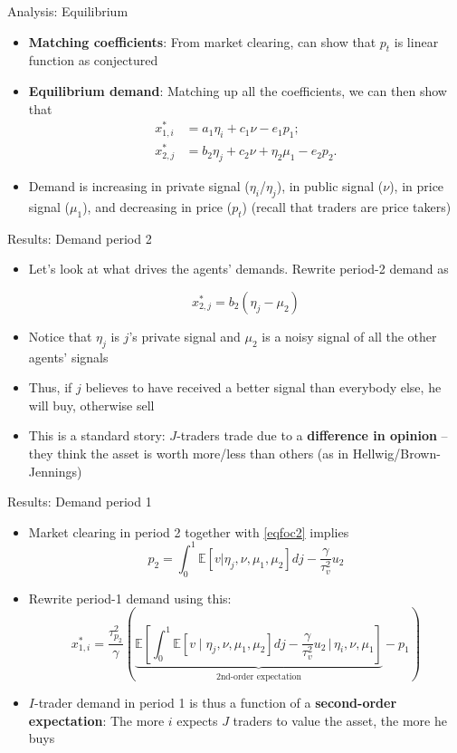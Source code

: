 \documentclass[english,10pt
,aspectratio=169
]{beamer}
\begin{document}
\begin{frame}{Analysis: Equilibrium}
	\begin{itemize}
		\item \textbf{Matching coefficients}: From market clearing, can show that $p_t$ is linear function as conjectured
		\item \textbf{Equilibrium demand}: Matching up all the coefficients, we can then show that
		\begin{align}
		x^*_{1,i} &=  a_1 \eta_i+c_1 \nu -e_1 p_1; \label{eqdem1} \\
		x^*_{2,j} &= b_2 \eta_j+c_2 \nu + \eta_2\mu_1-e_2 p_2. \label{eqdem2}
		\end{align} 
		\item Demand is increasing in private signal ($\eta_i$/$\eta_j$), in public signal ($\nu$), in price signal ($\mu_1$), and decreasing in price ($p_t$) 
		(recall that traders are price takers)
	\end{itemize}
\end{frame}


\begin{frame}{Results: Demand period 2}
	\begin{itemize}
		\item Let's look at what drives the agents' demands. Rewrite period-2 demand as 
		\begin{block}{}
			\begin{equation} \label{eqdem2z}
			x^*_{2,j} = b_2 (\eta_j - \mu_2) 
			\end{equation}
		\end{block}
		\item Notice that $\eta_j$ is $j$'s private signal and  $\mu_2$ is a noisy signal of all the other agents' signals
		\item Thus, if $j$ believes to have received a better signal than everybody else, he will buy, otherwise sell
		\item This is a standard story: $J$-traders trade due to a \textbf{difference in opinion} -- they think the asset is worth more/less than others (as in Hellwig/Brown-Jennings)
	\end{itemize}
\end{frame}


\begin{frame}{Results: Demand period 1}
	\begin{itemize}
		\item Market clearing in period 2 together with \eqref{eqfoc2} implies
		\[
		p_2 = \int_0^1 \mathbb{E}[v|\eta_j, \nu , \mu_1, \mu_2] dj - \frac{\gamma}{\tau^2_v}u_2
		\]
		\item Rewrite period-1 demand using this:
		\[
			x^*_{1,i} = \frac{\tau^2_{p_2}}{\gamma} \left( \underbrace{\mathbb{E}\left[ \int_0^1 \mathbb{E}[v \mid \eta_j, \nu , \mu_1, \mu_2 ] dj -\frac{\gamma}{\tau^2_v}u_2 \,\bigg|\, \eta_i,\nu,\mu_1 \right]}_{\text{2nd-order expectation}}-p_1 \right)
		\]
		\item $I$-trader demand in period 1 is thus a function of a \textbf{second-order expectation}: 
		The more $i$ expects $J$ traders to value the asset, the more he buys 
	\end{itemize}
\end{frame}
\end{document}
